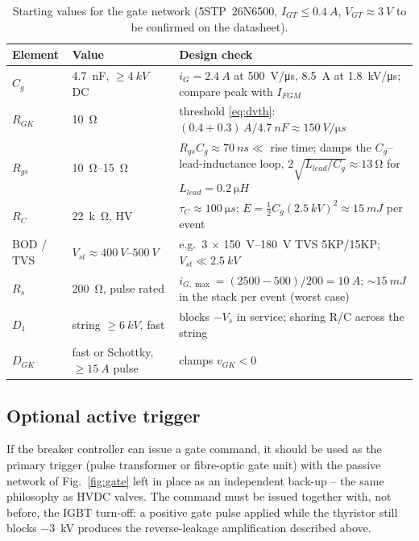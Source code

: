 \documentclass[11pt,a4paper]{article}
\begin{document}
\begin{table}[htbp]
\centering
\caption{Starting values for the gate network (5STP~26N6500, $I_{GT} \le \SI{0.4}{A}$,
$V_{GT} \approx \SI{3}{V}$ to be confirmed on the datasheet).}
\label{tab:gate}
\begin{tabular}{@{}llp{7.2cm}@{}}
\toprule
Element & Value & Design check \\
\midrule
$C_g$ & \SI{4.7}{nF}, $\ge \SI{4}{kV}$ DC & $i_G = \SI{2.4}{A}$ at \SI{500}{V/\micro s}, \SI{8.5}{A} at \SI{1.8}{kV/\micro s}; compare peak with $I_{FGM}$ \\
$R_{GK}$ & \SI{10}{\ohm} & threshold \eqref{eq:dvth}: $(0.4 + 0.3)\,\si{A}/\SI{4.7}{nF} \approx \SI{150}{V/\micro s}$ \\
$R_{gs}$ & \SIrange{10}{15}{\ohm} & $R_{gs}C_g \approx \SI{70}{ns} \ll$ rise time; damps the $C_g$--lead-inductance loop, $2\sqrt{L_{lead}/C_g} \approx \SI{13}{\ohm}$ for $L_{lead} = \SI{0.2}{\micro H}$ \\
$R_C$ & \SI{22}{k\ohm}, HV & $\tau_C \approx \SI{100}{\micro s}$; $E = \tfrac12 C_g (\SI{2.5}{kV})^2 \approx \SI{15}{mJ}$ per event \\
BOD / TVS & $V_{st} \approx \SIrange{400}{500}{V}$ & e.g.\ 3 $\times$ \SIrange{150}{180}{V} TVS 5KP/15KP; $V_{st} \ll \SI{2.5}{kV}$ \\
$R_s$ & \SI{200}{\ohm}, pulse rated & $i_{G,\max} = (2500 - 500)/200 = \SI{10}{A}$; $\sim\!\SI{15}{mJ}$ in the stack per event (worst case) \\
$D_1$ & string $\ge \SI{6}{kV}$, fast & blocks $-V_s$ in service; sharing R/C across the string \\
$D_{GK}$ & fast or Schottky, $\ge \SI{15}{A}$ pulse & clamps $v_{GK} < 0$ \\
\bottomrule
\end{tabular}
\end{table}

\subsection{Optional active trigger}

If the breaker controller can issue a gate command, it should be used as the primary trigger
(pulse transformer or fibre-optic gate unit) with the passive network of Fig.~\ref{fig:gate} left
in place as an independent back-up -- the same philosophy as HVDC valves. The command must be
issued together with, not before, the IGBT turn-off: a positive gate pulse applied while the
thyristor still blocks \SI{-3}{kV} produces the reverse-leakage amplification described above.
\end{document}
